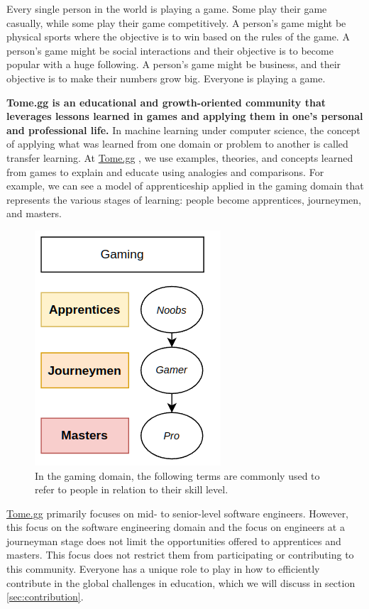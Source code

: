 \documentclass[journal, onecolumn]{IEEEtran}
\newcommand{\tomegg}{
  \href{http://tome.gg}{Tome.gg}
}
\begin{document}
Every single person in the world is playing a game. Some play their game casually,
while some play their game competitively. A person's game might be physical sports
where the objective is to win based on the rules of the game. A person's game
might be social interactions and their objective is to become popular with a huge 
following. A person's game might be business, and their objective is to make their 
numbers grow big. Everyone is playing a game.

  \textbf{Tome.gg is an educational and growth-oriented community that leverages
  lessons learned in games and applying them in one's personal and professional life.} 
  In machine learning under computer science, the concept of applying what was 
  learned from one domain or problem to another is called transfer learning\cite{b5}.
  At \tomegg, we use examples, theories, and concepts learned from games to explain
  and educate using analogies and comparisons. 
  For example, we can see a model of apprenticeship\cite{b4} applied in the gaming domain
  that represents the various stages of learning: people become apprentices, 
  journeymen, and masters.

\begin{figure}[t]
  \includegraphics[scale=0.7]{stakeholders-gaming}
  \centering
  \caption{In the gaming domain, the following terms are commonly used to refer 
  to people in relation to their skill level.}
  \label{fig:stakeholders-gaming} 
\end{figure}

\tomegg primarily focuses on mid- to senior-level software engineers. However, 
this focus on the software engineering domain and the focus on engineers at a
journeyman stage does not limit the opportunities offered to apprentices and 
masters. This focus does not restrict them from participating or contributing 
to this community. Everyone has a unique role to play in how to efficiently 
contribute in the global challenges in education, which we will discuss in 
section \ref{sec:contribution}.
\end{document}
